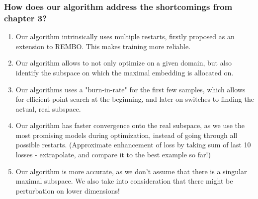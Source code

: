 \subsubsection{How does our algorithm address the shortcomings from chapter 3?}

\begin{enumerate}
\item Our algorithm intrinsically uses multiple restarts, firstly proposed as an extension to REMBO.
This makes training more reliable.
\item Our algorithm allows to not only optimize on a given domain, but also identify the subspace on which the maximal embedding is allocated on.
\item Our algorithms uses a "burn-in-rate" for the first few samples, which allows for efficient point search at the beginning, and later on switches to finding the actual, real subspace.
\item Our algorithm has faster convergence onto the real subspace, as we use the most promising models during optimization, instead of going through all possible restarts. (Approximate enhancement of loss by taking sum of last 10 losses - extrapolate, and compare it to the best example so far!)
\item Our algorithm is more accurate, as we don't assume that there is a singular maximal subspace. 
We also take into consideration that there might be perturbation on lower dimensions!
\end{enumerate}


